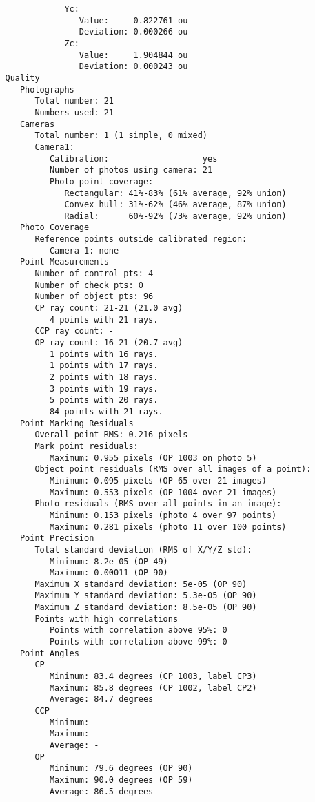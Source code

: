 \documentclass{article}
\begin{document}
\begin{verbatim}
               Yc:
                  Value:     0.822761 ou
                  Deviation: 0.000266 ou
               Zc:
                  Value:     1.904844 ou
                  Deviation: 0.000243 ou
   Quality
      Photographs
         Total number: 21
         Numbers used: 21
      Cameras
         Total number: 1 (1 simple, 0 mixed)
         Camera1:
            Calibration:                   yes
            Number of photos using camera: 21
            Photo point coverage:
               Rectangular: 41%-83% (61% average, 92% union)
               Convex hull: 31%-62% (46% average, 87% union)
               Radial:      60%-92% (73% average, 92% union)
      Photo Coverage
         Reference points outside calibrated region:
            Camera 1: none
      Point Measurements
         Number of control pts: 4
         Number of check pts: 0
         Number of object pts: 96
         CP ray count: 21-21 (21.0 avg)
            4 points with 21 rays.
         CCP ray count: -
         OP ray count: 16-21 (20.7 avg)
            1 points with 16 rays.
            1 points with 17 rays.
            2 points with 18 rays.
            3 points with 19 rays.
            5 points with 20 rays.
            84 points with 21 rays.
      Point Marking Residuals
         Overall point RMS: 0.216 pixels
         Mark point residuals:
            Maximum: 0.955 pixels (OP 1003 on photo 5)
         Object point residuals (RMS over all images of a point):
            Minimum: 0.095 pixels (OP 65 over 21 images)
            Maximum: 0.553 pixels (OP 1004 over 21 images)
         Photo residuals (RMS over all points in an image):
            Minimum: 0.153 pixels (photo 4 over 97 points)
            Maximum: 0.281 pixels (photo 11 over 100 points)
      Point Precision
         Total standard deviation (RMS of X/Y/Z std):
            Minimum: 8.2e-05 (OP 49)
            Maximum: 0.00011 (OP 90)
         Maximum X standard deviation: 5e-05 (OP 90)
         Maximum Y standard deviation: 5.3e-05 (OP 90)
         Maximum Z standard deviation: 8.5e-05 (OP 90)
         Points with high correlations
            Points with correlation above 95%: 0
            Points with correlation above 99%: 0
      Point Angles
         CP
            Minimum: 83.4 degrees (CP 1003, label CP3)
            Maximum: 85.8 degrees (CP 1002, label CP2)
            Average: 84.7 degrees
         CCP
            Minimum: -
            Maximum: -
            Average: -
         OP
            Minimum: 79.6 degrees (OP 90)
            Maximum: 90.0 degrees (OP 59)
            Average: 86.5 degrees

\end{verbatim}
\end{document}
